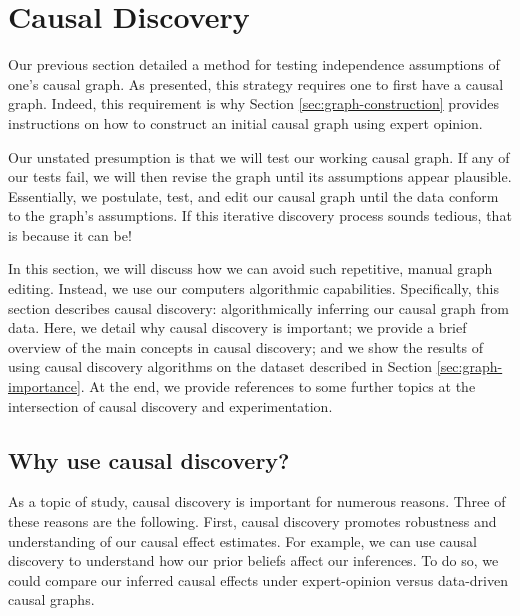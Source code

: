 \section{Causal Discovery}
\label{sec:causal-discovery}

Our previous section detailed a method for testing independence assumptions of one's causal graph.
As presented, this strategy requires one to first have a causal graph.
Indeed, this requirement is why Section \ref{sec:graph-construction} provides instructions on how to construct an initial causal graph using expert opinion.

Our unstated presumption is that we will test our working causal graph.
If any of our tests fail, we will then revise the graph until its assumptions appear plausible.
Essentially, we postulate, test, and edit our causal graph until the data conform to the graph's assumptions.
If this iterative discovery process sounds tedious, that is because it can be!

In this section, we will discuss how we can avoid such repetitive, manual graph editing.
Instead, we use our computers algorithmic capabilities.
Specifically, this section describes causal discovery:
algorithmically inferring our causal graph from data.
Here, we detail why causal discovery is important;
we provide a brief overview of the main concepts in causal discovery;
and we show the results of using causal discovery algorithms on the dataset described in Section \ref{sec:graph-importance}.
At the end, we provide references to some further topics at the intersection of causal discovery and experimentation.

\subsection{Why use causal discovery?}
\label{sec:why-causal-discovery}

As a topic of study, causal discovery is important for numerous reasons.
Three of these reasons are the following.
First, causal discovery promotes robustness and understanding of our causal effect estimates.
For example, we can use causal discovery to understand how our prior beliefs affect our inferences.
To do so, we could compare our inferred causal effects under expert-opinion versus data-driven causal graphs.

